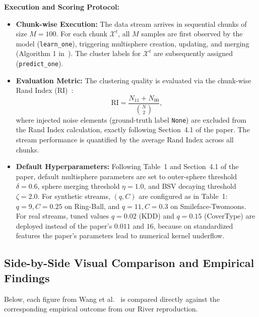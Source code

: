 \noindent\textbf{Execution and Scoring Protocol:}
\begin{itemize}
  \item \textbf{Chunk-wise Execution:} The data stream arrives in sequential chunks of size $M=100$. For each chunk $\mathcal{X}^t$, all $M$ samples are first observed by the model (\texttt{learn\_one}), triggering multisphere creation, updating, and merging (Algorithm 1 in~\cite{wang2013svstream}). The cluster labels for $\mathcal{X}^t$ are subsequently assigned (\texttt{predict\_one}).
  \item \textbf{Evaluation Metric:} The clustering quality is evaluated via the chunk-wise Rand Index (RI)~\cite{wang2013svstream}:
  \begin{equation}
    \text{RI} = \frac{N_{11} + N_{00}}{\binom{N}{2}},
  \end{equation}
  where injected noise elements (ground-truth label \texttt{None}) are excluded from the Rand Index calculation, exactly following Section~4.1 of the paper. The stream performance is quantified by the average Rand Index across all chunks.
  \item \textbf{Default Hyperparameters:} Following Table~1 and Section~4.1 of the paper, default multisphere parameters are set to outer-sphere threshold $\delta=0.6$, sphere merging threshold $\eta=1.0$, and BSV decaying threshold $\zeta=2.0$. For synthetic streams, $(q, C)$ are configured as in Table~1: $q=9, C=0.25$ on Ring-Ball, and $q=11, C=0.3$ on Smileface-Twomoons. For real streams, tuned values $q=0.02$ (KDD) and $q=0.15$ (CoverType) are deployed instead of the paper's $0.011$ and $16$, because on standardized features the paper's parameters lead to numerical kernel underflow.
\end{itemize}

\subsection{Side-by-Side Visual Comparison and Empirical Findings}
\label{subsec:svstream_visual_comp}

Below, each figure from Wang et al.~\cite{wang2013svstream} is compared directly against the corresponding empirical outcome from our River reproduction.

